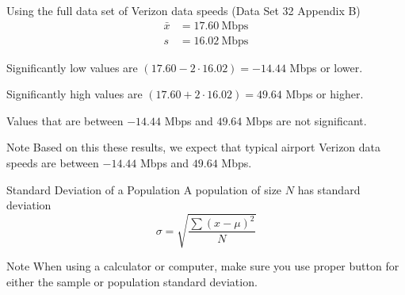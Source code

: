 \documentclass{beamer}
\begin{document}
\begin{frame}
\begin{example}
Using the full data set of Verizon data speeds (Data Set 32 Appendix B)
\begin{equation*}
\begin{aligned}
\bar{x} &= 17.60~\text{Mbps}\\
s &= 16.02~\text{Mbps} 
\end{aligned}
\end{equation*}\pause

Significantly low values are $(17.60-2\cdot 16.02)=-14.44$ Mbps or lower.\pause

\vspace{2mm}
Significantly high values are $(17.60+2\cdot 16.02)=49.64$ Mbps or higher.\pause

\vspace{2mm}
Values that are between $-14.44$ Mbps and $49.64$ Mbps are not significant.
\end{example}\pause

\begin{block}{Note}
Based on this these results, we expect that typical airport Verizon data speeds are between $-14.44$ Mbps and $49.64$ Mbps.
\end{block}
\end{frame}

\begin{frame}
\begin{block}{Standard Deviation of a Population}
A population of size $N$ has standard deviation
\begin{equation*}
\sigma = \sqrt{\dfrac{\sum{(x-\mu)}^2}{N}}
\end{equation*}
\end{block}\pause

\begin{block}{Note}
When using a calculator or computer, make sure you use proper button for either the sample or population standard deviation.
\end{block}
\end{frame}
\end{document}
